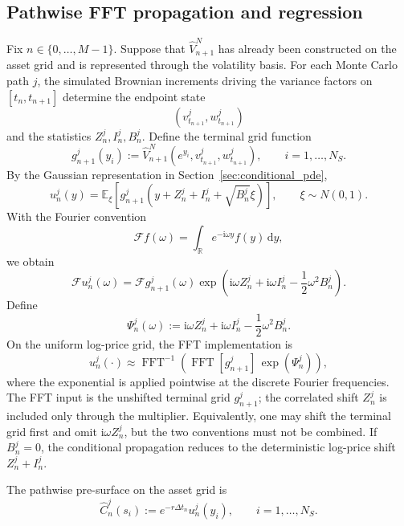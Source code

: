 \documentclass[pdflatex,sn-mathphys-num]{sn-jnl}
\theoremstyle{thmstyleone}%
\theoremstyle{thmstylethree}%
\theoremstyle{thmstyletwo}%
\newcommand{\dd}{\mathrm d}
\newcommand{\E}{\mathbb E}
\newcommand{\R}{\mathbb R}
\begin{document}
\subsection{Pathwise FFT propagation and regression}
Fix $n\in\{0,\ldots,M-1\}$. Suppose that $\widehat V_{n+1}^N$ has already been
constructed on the asset grid and is represented through the volatility basis.
For each Monte Carlo path $j$, the simulated Brownian increments driving the
variance factors on $[t_n,t_{n+1}]$ determine the endpoint state
$$
(v_{t_{n+1}}^j,w_{t_{n+1}}^j)
$$
and the statistics $Z_n^j,I_n^j,B_n^j$. Define the terminal grid function
$$
g_{n+1}^j(y_i)
:=
\widehat V_{n+1}^N
\left(e^{y_i},v_{t_{n+1}}^j,w_{t_{n+1}}^j\right),
\qquad i=1,\ldots,N_S.
$$
By the Gaussian representation in Section~\ref{sec:conditional_pde},
$$
u_n^j(y)
=
\E_\xi\!\left[
g_{n+1}^j
\left(
y+Z_n^j+I_n^j+\sqrt{B_n^j}\xi
\right)
\right],
\qquad \xi\sim N(0,1).
$$
With the Fourier convention
$$
\mathcal F f(\omega)
=
\int_{\R}e^{-\mathrm i\omega y}f(y)\,\dd y,
$$
we obtain
$$
\mathcal F u_n^j(\omega)
=
\mathcal F g_{n+1}^j(\omega)
\exp\left(
\mathrm i\omega Z_n^j+\mathrm i\omega I_n^j-\frac12\omega^2B_n^j
\right).
$$
Define
$$
\Psi_n^j(\omega)
:=
\mathrm i\omega Z_n^j+\mathrm i\omega I_n^j-\frac12\omega^2B_n^j.
$$
On the uniform log-price grid, the FFT implementation is
\begin{equation}
u_n^j(\cdot)
\approx
\operatorname{FFT}^{-1}
\left(
\operatorname{FFT}[g_{n+1}^j]\,
\exp(\Psi_n^j)
\right),
\label{eq:fft-recursion}
\end{equation}
where the exponential is applied pointwise at the discrete Fourier frequencies.
The FFT input is the unshifted terminal grid $g_{n+1}^j$; the correlated shift
$Z_n^j$ is included only through the multiplier. Equivalently, one may shift the
terminal grid first and omit $\mathrm i\omega Z_n^j$, but the two conventions
must not be combined. If $B_n^j=0$, the conditional propagation reduces to the
deterministic log-price shift $Z_n^j+I_n^j$.

The pathwise pre-surface on the asset grid is
$$
\widehat C_n^j(s_i)
:=
e^{-r\Delta t_n}u_n^j(y_i),
\qquad i=1,\ldots,N_S.
$$
\end{document}
